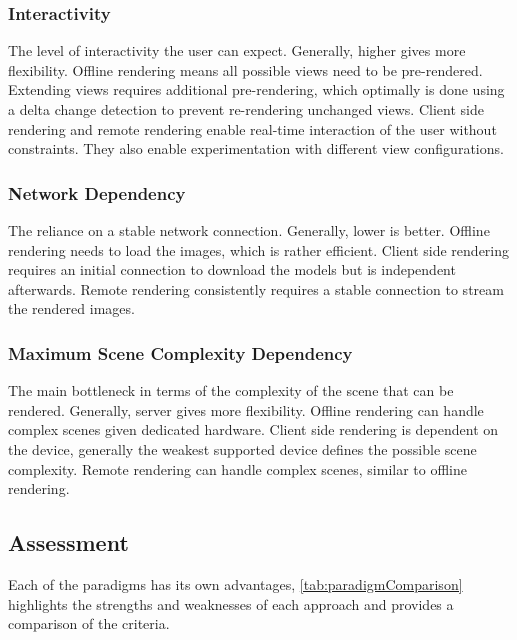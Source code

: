 \subsubsection{Interactivity}

The level of interactivity the user can expect. Generally, higher gives more flexibility. Offline rendering means all possible views need to be pre-rendered. Extending views requires additional pre-rendering, which optimally is done using a delta change detection to prevent re-rendering unchanged views. Client side rendering and remote rendering enable real-time interaction of the user without constraints. They also enable experimentation with different view configurations.

\subsubsection{Network Dependency}

The reliance on a stable network connection. Generally, lower is better. Offline rendering needs to load the images, which is rather efficient. Client side rendering requires an initial connection to download the models but is independent afterwards. Remote rendering consistently requires a stable connection to stream the rendered images.

\subsubsection{Maximum Scene Complexity Dependency}

The main bottleneck in terms of the complexity of the scene that can be rendered. Generally, server gives more flexibility. Offline rendering can handle complex scenes given dedicated hardware. Client side rendering is dependent on the device, generally the weakest supported device defines the possible scene complexity. Remote rendering can handle complex scenes, similar to offline rendering.

\subsection*{Assessment}

Each of the paradigms has its own advantages, \autoref{tab:paradigmComparison} highlights the strengths and weaknesses of each approach and provides a comparison of the criteria.


